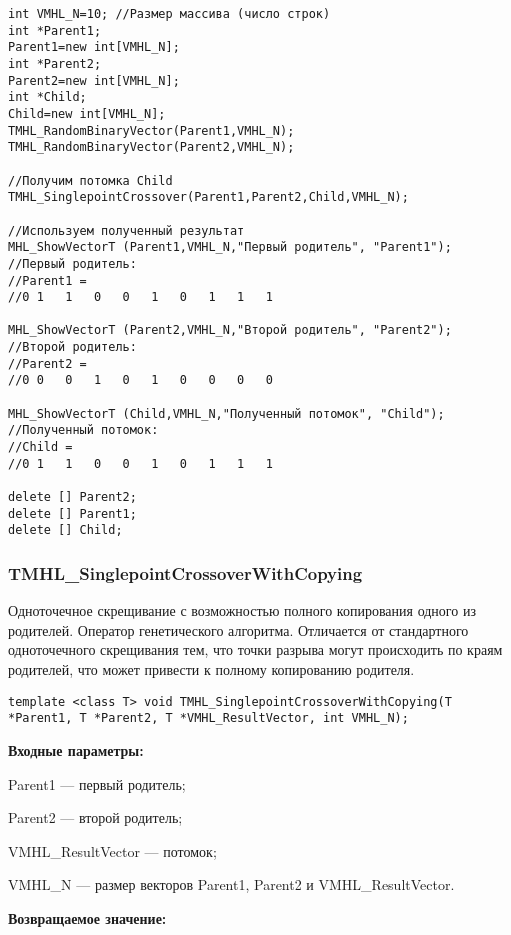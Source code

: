\documentclass[a4paper,12pt]{article}
\begin{document}
\begin{lstlisting}[label=code_use_TMHL_SinglepointCrossover,caption=Пример использования]
int VMHL_N=10; //Размер массива (число строк)
int *Parent1;
Parent1=new int[VMHL_N];
int *Parent2;
Parent2=new int[VMHL_N];
int *Child;
Child=new int[VMHL_N];
TMHL_RandomBinaryVector(Parent1,VMHL_N);
TMHL_RandomBinaryVector(Parent2,VMHL_N);

//Получим потомка Child
TMHL_SinglepointCrossover(Parent1,Parent2,Child,VMHL_N);

//Используем полученный результат
MHL_ShowVectorT (Parent1,VMHL_N,"Первый родитель", "Parent1");
//Первый родитель:
//Parent1 =	
//0	1	1	0	0	1	0	1	1	1

MHL_ShowVectorT (Parent2,VMHL_N,"Второй родитель", "Parent2");
//Второй родитель:
//Parent2 =	
//0	0	0	1	0	1	0	0	0	0

MHL_ShowVectorT (Child,VMHL_N,"Полученный потомок", "Child");
//Полученный потомок:
//Child =	
//0	1	1	0	0	1	0	1	1	1

delete [] Parent2;
delete [] Parent1;
delete [] Child;
\end{lstlisting}

\subsubsection{TMHL\_SinglepointCrossoverWithCopying}\label{TMHL_SinglepointCrossoverWithCopying}

Одноточечное скрещивание с возможностью полного копирования одного из родителей. Оператор генетического алгоритма. Отличается от стандартного одноточечного скрещивания тем, что точки разрыва могут происходить по краям родителей, что может привести к полному копированию родителя.


\begin{lstlisting}[label=code_syntax_TMHL_SinglepointCrossoverWithCopying,caption=Синтаксис]
template <class T> void TMHL_SinglepointCrossoverWithCopying(T *Parent1, T *Parent2, T *VMHL_ResultVector, int VMHL_N);
\end{lstlisting}

\textbf{Входные параметры:}
 
Parent1 --- первый родитель;
 
Parent2 --- второй родитель;
 
VMHL\_ResultVector --- потомок;
 
VMHL\_N --- размер векторов Parent1, Parent2 и VMHL\_ResultVector.

\textbf{Возвращаемое значение:}
\end{document}

